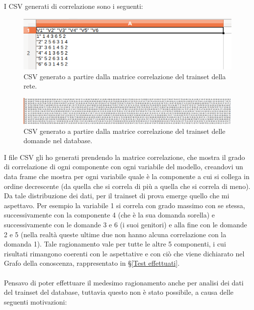 I CSV generati di correlazione sono i seguenti:

\begin{figure}[H]
\centering
	\includegraphics[width=0.60\linewidth]{../../PCA/plot/CSV_rete-prova.png}
	\caption{CSV generato a partire dalla matrice correlazione del trainset della rete.}
\end{figure}
\begin{figure}[H]
\centering
	\includegraphics[width=1\linewidth]{../../PCA/plot/CSV_rete-db.png}
	\caption{CSV generato a partire dalla matrice correlazione del trainset delle domande nel database.}
\end{figure}
\noindent
I file CSV gli ho generati prendendo la matrice correlazione, che mostra il grado di correlazione di ogni componente con ogni variabile del modello, creandovi un data frame che mostra per ogni variabile quale \`e la componente a cui si collega in ordine decrescente (da  quella che si correla di pi\`u a quella che si correla di meno).\\ 
Da tale distribuzione dei dati, per il trainset di prova emerge quello che mi aspettavo. Per esempio la variabile 1 si correla con grado massimo con se stessa, successivamente con la componente 4 (che \`e la sua domanda sorella) e successivamente con le domande 3 e 6 (i suoi genitori) e alla fine con le domande 2 e 5 (nella realt\`a queste ultime due non hanno alcuna correlazione con la domanda 1). Tale ragionamento vale per tutte le altre  5 componenti, i cui risultati rimangono coerenti con le aspettative e con ci\`o che viene dichiarato nel Grafo della conoscenza, rappresentato in §\ref{Test effettuati}.\\\\
Pensavo di poter effettuare il medesimo ragionamento anche per analisi dei dati del trainset del database, tuttavia questo non \`e stato possibile, a causa delle seguenti motivazioni:
